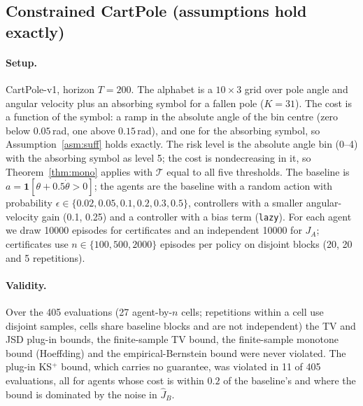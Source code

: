 \documentclass{article}
\begin{document}
\subsection{Constrained CartPole (assumptions hold exactly)}

\paragraph{Setup.} CartPole-v1, horizon $T=200$. The alphabet is a $10\times3$ grid over pole angle and angular velocity plus an absorbing symbol for a fallen pole ($K=31$). The cost is a function of the symbol: a ramp in the absolute angle of the bin centre (zero below $0.05$\,rad, one above $0.15$\,rad), and one for the absorbing symbol, so Assumption~\ref{asm:suff} holds exactly. The risk level is the absolute angle bin (0--4) with the absorbing symbol as level 5; the cost is nondecreasing in it, so Theorem~\ref{thm:mono} applies with $\mathcal T$ equal to all five thresholds. The baseline is $a=\mathbf 1[\theta+0.5\dot\theta>0]$; the agents are the baseline with a random action with probability $\epsilon\in\{0.02,0.05,0.1,0.2,0.3,0.5\}$, controllers with a smaller angular-velocity gain (0.1, 0.25) and a controller with a bias term (\texttt{lazy}). For each agent we draw 10000 episodes for certificates and an independent 10000 for $J_A$; certificates use $n\in\{100,500,2000\}$ episodes per policy on disjoint blocks (20, 20 and 5 repetitions).

\begin{table}[ht]
\centering
\caption{CartPole: realised cost $J_A$ and bounds (mean over disjoint samples). The baseline's cost is $J_B=0.1$. TV, JSD and KS$^+$ are plug-in at $n=2000$; the other columns are finite-sample bounds at the stated $n$ with $\delta=0.025$. Ceiling: 200.}
\label{tab:cartpole}
\small

\end{table}

\paragraph{Validity.} Over the 405 evaluations (27 agent-by-$n$ cells; repetitions within a cell use disjoint samples, cells share baseline blocks and are not independent) the TV and JSD plug-in bounds, the finite-sample TV bound, the finite-sample monotone bound (Hoeffding) and the empirical-Bernstein bound were never violated. The plug-in KS$^+$ bound, which carries no guarantee, was violated in 11 of 405 evaluations, all for agents whose cost is within $0.2$ of the baseline's and where the bound is dominated by the noise in $\hat J_B$.
\end{document}
